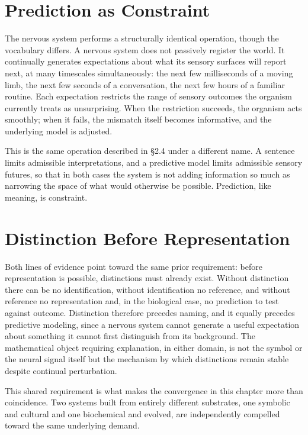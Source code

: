 \documentclass[11pt,oneside]{book}
\numberwithin{equation}{chapter}
\theoremstyle{definition}
\theoremstyle{plain}
\begin{document}
\section{Prediction as Constraint}

The nervous system performs a structurally identical operation, though the vocabulary differs. A nervous system does not passively register the world. It continually generates expectations about what its sensory surfaces will report next, at many timescales simultaneously: the next few milliseconds of a moving limb, the next few seconds of a conversation, the next few hours of a familiar routine. Each expectation restricts the range of sensory outcomes the organism currently treats as unsurprising. When the restriction succeeds, the organism acts smoothly; when it fails, the mismatch itself becomes informative, and the underlying model is adjusted.

This is the same operation described in \S 2.4 under a different name. A sentence limits admissible interpretations, and a predictive model limits admissible sensory futures, so that in both cases the system is not adding information so much as narrowing the space of what would otherwise be possible. Prediction, like meaning, is constraint.

\section{Distinction Before Representation}

Both lines of evidence point toward the same prior requirement: before representation is possible, distinctions must already exist. Without distinction there can be no identification, without identification no reference, and without reference no representation and, in the biological case, no prediction to test against outcome. Distinction therefore precedes naming, and it equally precedes predictive modeling, since a nervous system cannot generate a useful expectation about something it cannot first distinguish from its background. The mathematical object requiring explanation, in either domain, is not the symbol or the neural signal itself but the mechanism by which distinctions remain stable despite continual perturbation.

This shared requirement is what makes the convergence in this chapter more than coincidence. Two systems built from entirely different substrates, one symbolic and cultural and one biochemical and evolved, are independently compelled toward the same underlying demand.
\end{document}
